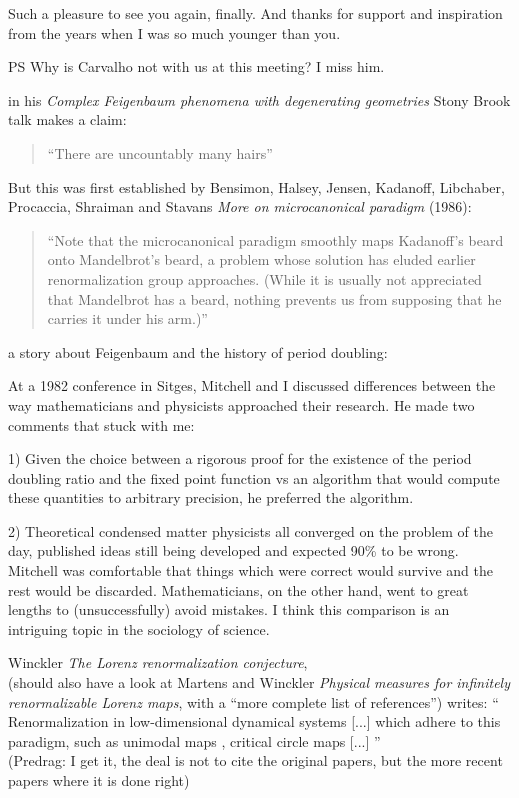 \begin{description}
Such a pleasure to see you again, finally. And thanks for support and
inspiration from the years when I was so much younger than you.

PS Why is Carvalho not with us at this meeting? I miss him.

\item[2021-03-09 Davoud Cheraghi] in his
{\em Complex Feigenbaum phenomena with degenerating geometries}
 {Stony Brook talk}
makes a claim:
\begin{quote}
``There are uncountably many hairs''
\end{quote}
But this was first established by Bensimon, Halsey, Jensen, Kadanoff,
Libchaber, Procaccia, Shraiman and Stavans {\em More on
microcanonical paradigm} (1986):

\begin{quote}
``Note that the microcanonical paradigm smoothly maps Kadanoff's beard onto
Mandelbrot's beard, a problem whose solution has eluded earlier
renormalization group approaches. (While it is usually not appreciated
that Mandelbrot has a beard, nothing prevents us from supposing that he
carries it under his arm.)''
\end{quote}


\item[2019-12-29 John Guckenheimer]  %
a story about Feigenbaum and the history of period doubling:

At a 1982 conference in Sitges, Mitchell and I discussed differences
between the way mathematicians and physicists approached their research.
He made two comments that stuck with me:

1) Given the choice between a rigorous proof for the existence of the
period doubling ratio and the fixed point function vs an algorithm that
would compute these quantities to arbitrary precision, he preferred the
algorithm.

2) Theoretical condensed matter physicists all converged on the problem
of the day, published ideas still being developed and expected 90\% to be
wrong. Mitchell was comfortable that things which were correct would survive
and the rest would be discarded. Mathematicians, on the other hand, went
to great lengths to (unsuccessfully) avoid mistakes. I think this
comparison is an intriguing topic in the sociology of science.

\newpage %
\item[2018-05-03 Bj{\"o}rn]
{Winckler}
{\em The {Lorenz} renormalization conjecture}, \\
(should also have a look at Martens and Winckler {\em
Physical measures for infinitely renormalizable {Lorenz} maps}, with a
``more complete list of references'')
writes: ``
Renormalization in low-dimensional dynamical systems [...] which adhere
to this paradigm, such as unimodal maps
\cite{Sullivan92,McMullen96,AviLyu11}, critical circle maps
\cite{deFaria92,Yampolsky03} [...]
''
\\(Predrag: I get it, the deal is not to cite the original papers,
but the more recent papers where it is done right)


\end{description}
